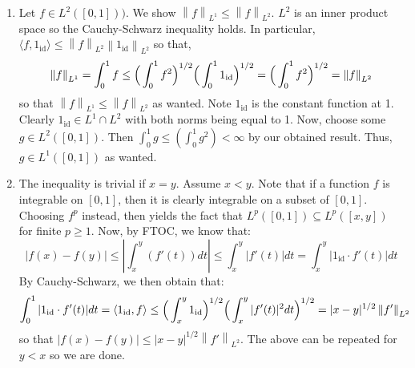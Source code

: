 \documentclass[12pt]{article}
\newcommand{\norm}[1]{\left\lVert#1\right\rVert}
\newenvironment{solution}[2][Solution]{\begin{trivlist}
\item[\hskip \labelsep {\bfseries #1}]}{\end{trivlist}}
\begin{document}
\begin{solution}{}
	\begin{enumerate}
		\item[(i.)] Let $f\in L^2([0,1]))$. We show $\norm{f}_{L^1} \leq \norm{f}_{L^2}$. $L^2$ is an inner product space so the Cauchy-Schwarz inequality holds.
		In particular, $\langle f, 1_{\text{id}}\rangle \leq \norm{f}_{L^2}\norm{1_{\text{id}}}_{L^2}$ so that,
		\[ \norm{f}_{L^1} = \int_0^1 f \leq \Big{(}\int_0^1 f^2\Big{)}^{1/2}\Big{(}\int_0^1 1_{\text{id}}\Big{)}^{1/2} = \Big{(}\int_0^1 f^2\Big{)}^{1/2} = \norm{f}_{L^2}\]
		so that $\norm{f}_{L^1} \leq \norm{f}_{L^2}$ as wanted. Note $1_{\text{id}}$ is the constant function at 1. Clearly $1_{\text{id}}\in L^1\cap L^2$ with both norms being
		equal to 1. Now, choose some $g\in L^2([0,1])$. Then $\int_0^1 g \leq (\int_0^1 g^2) < \infty$ by our obtained result. Thus, $g\in L^1([0,1])$ as wanted.
		\item[(ii.)] The inequality is trivial if $x=y$. Assume $x<y$. Note that if a function $f$ is integrable on $[0,1]$, then it is clearly integrable on a subset of $[0,1]$. Choosing
		$f^p$ instead, then yields the fact that $L^p([0,1]) \subseteq L^p([x,y])$ for finite $p\geq 1$. Now, by FTOC, we know that:
		\[ |f(x) - f(y)| \leq | \int_x^y (f'(t))dt | \leq \int_x^y |f'(t)| dt = \int_x^y |1_{\text{id}}\cdot f'(t)|dt\]
		By Cauchy-Schwarz, we then obtain that:
		\[ \int_0^1 |1_{\text{id}}\cdot f'(t)|dt = \langle 1_{\text{id}},f\rangle \leq \Big{(}\int_x^y 1_{\text{id}}\Big{)}^{1/2}\Big{(}\int_x^y |f'(t)|^2dt\Big{)}^{1/2} = |x-y|^{1/2}\norm{f'}_{L^2} \]
		so that $|f(x) - f(y)| \leq |x-y|^{1/2}\norm{f'}_{L^2}$. The above can be repeated for $y<x$ so we are done.
	\end{enumerate}
\end{solution}
\end{document}
